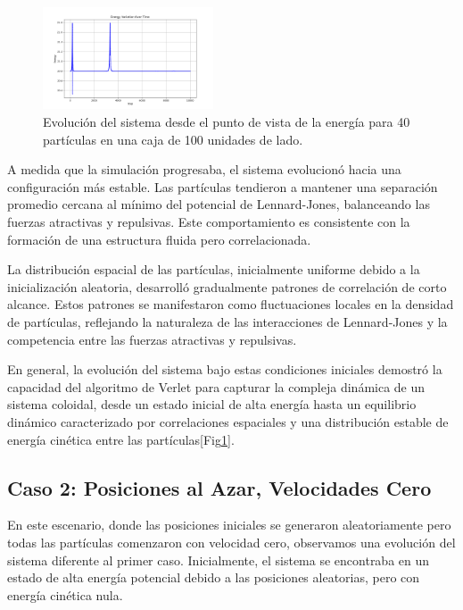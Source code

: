\documentclass[twocolumn]{article}
\begin{document}
\begin{figure}[h]
    \centering
    \includegraphics[width=0.45\textwidth]{figures/variacion_energia_40p_10ki_11.png}
    \caption{Evolución del sistema desde el punto de vista de la energía para 40 partículas en una caja de 100 unidades de lado.}
    \label{fig:case1_energia}
\end{figure}

A medida que la simulación progresaba, el sistema evolucionó hacia una configuración más estable. Las partículas tendieron a mantener una separación promedio cercana al mínimo del potencial de Lennard-Jones, balanceando las fuerzas atractivas y repulsivas. Este comportamiento es consistente con la formación de una estructura fluida pero correlacionada.

La distribución espacial de las partículas, inicialmente uniforme debido a la inicialización aleatoria, desarrolló gradualmente patrones de correlación de corto alcance. Estos patrones se manifestaron como fluctuaciones locales en la densidad de partículas, reflejando la naturaleza de las interacciones de Lennard-Jones y la competencia entre las fuerzas atractivas y repulsivas.

En general, la evolución del sistema bajo estas condiciones iniciales demostró la capacidad del algoritmo de Verlet para capturar la compleja dinámica de un sistema coloidal, desde un estado inicial de alta energía hasta un equilibrio dinámico caracterizado por correlaciones espaciales y una distribución estable de energía cinética entre las partículas[Fig\ref{fig:case1_energia}].

\subsection*{Caso 2: Posiciones al Azar, Velocidades Cero}

En este escenario, donde las posiciones iniciales se generaron aleatoriamente pero todas las partículas comenzaron con velocidad cero, observamos una evolución del sistema diferente al primer caso. Inicialmente, el sistema se encontraba en un estado de alta energía potencial debido a las posiciones aleatorias, pero con energía cinética nula.
\end{document}

